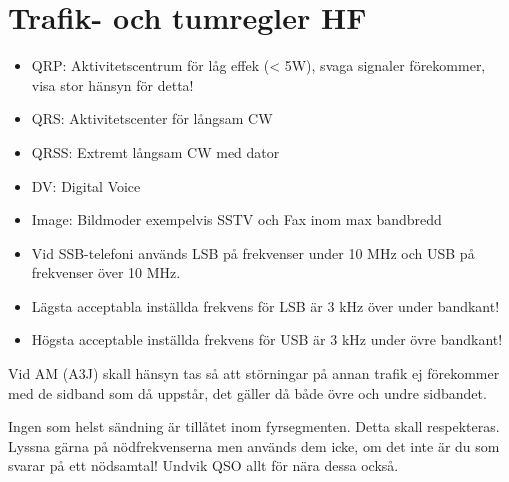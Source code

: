 \clearpage

\section{Trafik- och tumregler HF}

\begin{itemize}
\item QRP: Aktivitetscentrum för låg effek (< 5W), svaga signaler förekommer, visa stor hänsyn för detta!
\item QRS: Aktivitetscenter för långsam CW
\item QRSS: Extremt långsam CW med dator
\item DV: Digital Voice
\item Image: Bildmoder exempelvis SSTV och Fax inom max bandbredd
\item Vid SSB-telefoni används LSB på frekvenser under 10 MHz och USB på frekvenser över 10 MHz.
\item Lägsta acceptabla inställda frekvens för LSB är 3 kHz över under bandkant!
\item Högsta acceptable inställda frekvens för USB är 3 kHz under övre bandkant!
\end{itemize}

Vid AM (A3J) skall hänsyn tas så att störningar på annan trafik ej förekommer med de sidband som då uppstår, det gäller då både övre och undre sidbandet.

Ingen som helst sändning är tillåtet inom fyrsegmenten. Detta skall respekteras. Lyssna gärna på nödfrekvenserna men används dem icke, om det inte är du som svarar på ett nödsamtal! Undvik QSO allt för nära dessa också.

